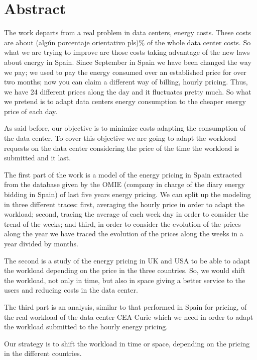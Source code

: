 \documentclass[a4paper,12pt,twoside,BCOR=10mm]{scrbook}
\begin{document}
\setcounter{page}{5}
\section*{\huge Abstract}
The work departs from a real problem in data centers, energy costs. These costs are about (algún porcentaje orientativo pls)\% of the whole data center costs. So what we are trying to improve are those costs taking advantage of the new laws about energy in Spain. Since September in Spain we have been changed the way we pay; we used to pay the energy consumed over an established price for over two months; now you can claim a different way of billing, hourly pricing. Thus, we have 24 different prices along the day and it fluctuates pretty much. So what we pretend is to adapt data centers energy consumption to the cheaper energy price of each day.

As said before, our objective is to minimize costs adapting the consumption of the data center. To cover this objective we are going to adapt the workload requests on the data center considering the price of the time the workload is submitted and it last.

The first part of the work is a model of the energy pricing in Spain extracted from the database given by the OMIE (company in charge of the diary energy bidding in Spain) of last five years energy pricing. We can split  up the modeling in three different traces: first, averaging the hourly price in order to adapt the workload; second, tracing the average of each week day in order to consider the trend of the weeks; and third, in order to consider the evolution of the prices along the year we have traced the evolution of the prices along the weeks in a year divided by months.

The second is a study of the energy pricing in UK and USA to be able to adapt the workload depending on the price in the three countries. So, we would shift the workload, not only in time, but also in space giving a better service to the users and reducing costs in the data center.

The  third part is an analysis, similar to that performed in Spain for pricing, of the real workload of the data center CEA Curie which we need in order to adapt the workload submitted to the hourly energy pricing.

Our strategy is to shift the workload in time or space, depending on the pricing in the different countries.



\vfill \vspace*{1cm}
\end{document}
